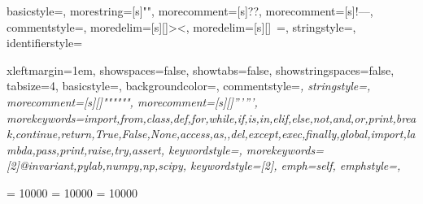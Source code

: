 
{
  basicstyle=\ttfamily\small,
  morestring=[s]{"}{"},
  morecomment=[s]{?}{?},
  morecomment=[s]{!--}{--},
  commentstyle=\color{darkgreen},
  moredelim=[s][\color{black}]{>}{<},
  moredelim=[s][\color{red}]{\ }{=},
  stringstyle=\color{blue},
  identifierstyle=\color{maroon}
}

{
  xleftmargin=1em,
  showspaces=false,
  showtabs=false,
  showstringspaces=false,
  tabsize=4,
  basicstyle=\ttfamily\small{},
  backgroundcolor=\color{Background},
  commentstyle=\color{Comments}\slshape,
  stringstyle=\color{Strings},
  morecomment=[s][\color{Strings}]{"""}{"""},
  morecomment=[s][\color{Strings}]{'''}{'''},
  morekeywords={import,from,class,def,for,while,if,is,in,elif,else,not,and,or,print,break,continue,return,True,False,None,access,as,,del,except,exec,finally,global,import,lambda,pass,print,raise,try,assert},
  keywordstyle={\color{Keywords}\bfseries},
  morekeywords={[2]@invariant,pylab,numpy,np,scipy},
  keywordstyle={[2]\color{Decorators}\slshape},
  emph={self},
  emphstyle={\color{self}\slshape},
}

\onehalfspacing
\frenchspacing

\clubpenalty = 10000
\widowpenalty = 10000
\displaywidowpenalty = 10000
